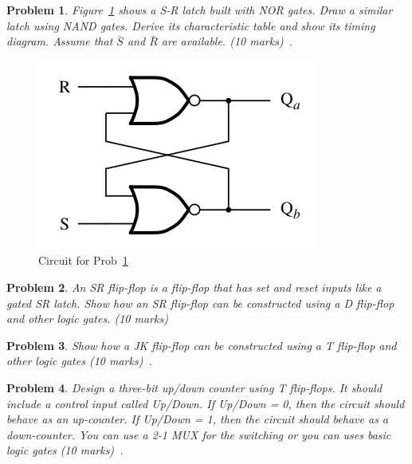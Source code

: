 \documentclass[twocolumn]{article}
\newtheorem{prob}{Problem}
\begin{document}
\begin{prob}
  Figure~\ref{fig:5.4} shows a S-R latch built with NOR gates. Draw a similar
latch using NAND gates. Derive its characteristic table and show its timing
diagram. Assume that $\bar{S}$ and $\bar{R}$ are available.
\label{prob:2} (10 marks)~\cite[Prob 5.2]{brown2013fundamentals}.
\end{prob}
\begin{figure}[ht!]
  \includegraphics[width=\linewidth]{fig-5.4.png}
  \caption{Circuit for Prob~\ref{prob:2}}
  \label{fig:5.4}
\end{figure}

\begin{prob}
  An SR flip-flop is a flip-flop that has set and reset inputs like a gated SR
latch. Show how an SR flip-flop can be constructed using a D flip-flop and other
logic gates. (10 marks)~\cite[Prob 5.5]{brown2013fundamentals}
\end{prob}

\begin{prob}
  Show how a JK flip-flop can be constructed using a T flip-flop and other logic
  gates (10 marks)~\cite[Prob 5.7]{brown2013fundamentals}.
\end{prob}

\begin{prob}
  Design a three-bit up/down counter using T flip-flops. It should include a control input
  called Up/Down. If Up/Down = 0, then the circuit should behave as an up-counter. If
  Up/Down = 1, then the circuit should behave as a down-counter. You can use a
  2-1 MUX for the switching or you can uses basic logic gates (10
  marks)~\cite[Prob 5.15]{brown2013fundamentals}.
\end{prob}
\end{document}

